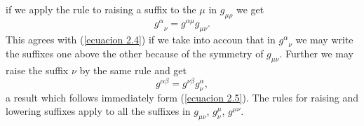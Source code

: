 if we apply the rule to raising a suffix to the $\mu$ in $g_{\mu\rho}$ we get
\[
 {g^{\alpha}}_{\nu} = g^{\alpha\mu} g_{\mu\nu}.
\]
This agrees with (\ref{ecuacion 2.4}) if we take into accoun that in 
${g^{\alpha}}_{\nu}$ we may write the suffixes one above the other because of 
the symmetry of $g_{\mu\nu}$. Further we may raise the suffix $\nu$ by the same 
rule and get
\[
 g^{\alpha\beta} = g^{\nu\beta} g^{\alpha}_{\nu},
\]
a result which follows immediately form (\ref{ecuacion 2.5}). The rules for 
raising and lowering suffixes apply to all the suffixes in $g_{\mu\nu}$, 
$g^{\mu}_{\nu}$, $g^{\mu\nu}$.
